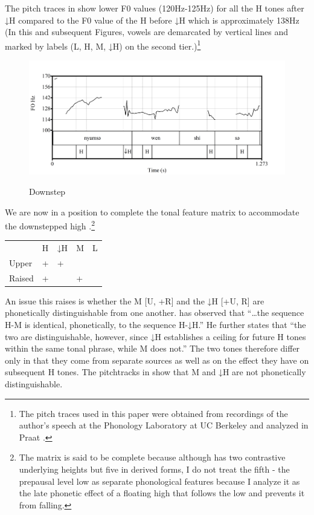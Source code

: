 \documentclass[output=paper,modfonts,nonflat,
colorlinks, citecolor=brown,
draftmode,
draft
]{langsci/langscibook}
\begin{document}
\ea\label{ex:akumbu:20}
\z

The pitch traces in  show lower F0 values (120Hz-125Hz) for all the H tones after ↓H compared to the F0 value of the H  before ↓H which is approximately 138Hz (In this and subsequent Figures, vowels are demarcated by vertical lines and marked by  labels (L, H, M, ↓H) on the second tier.)\footnote{The pitch traces used in this paper were obtained from recordings of the author’s speech at the Phonology Laboratory at UC Berkeley and analyzed in Praat \citep{Boersma2016}.}

\begin{figure}	
	{\includegraphics[width=\textwidth]{figures/fig-akumbu-1}}
	\caption{Downstep}\label{fig:akumbu:1}	
\end{figure}

We are now in a position to complete the tonal feature matrix to accommodate the downstepped high .\footnote{The matrix is said to be complete because although  has two contrastive underlying  heights but five in derived forms, I do not treat the fifth - the prepausal level low  as separate phonological  features because I analyze it as the late phonetic effect of a floating high  that follows the low  and prevents it from falling.} 

\ea\label{ex:akumbu:21}
\begin{tabular}[t]{lllll}
	&			H&	↓H&	M&	L\\
	Upper&		+&	+&	\textminus&	\textminus\\
	Raised&		+&	\textminus&	+&	\textminus\\
\end{tabular}
\z

An issue this raises is whether the M  [\textminus U, +R] and the ↓H  [+U, \textminus R] are phonetically distinguishable from one another. \citet[162]{Hyman1979babanki} has observed that “…the sequence H-M is identical, phonetically, to the sequence H-↓H.” He further states that “the two are distinguishable, however, since ↓H establishes a ceiling for future H tones within the same tonal phrase, while M does not.” The two tones therefore differ only in that they come from separate sources as well as on the effect they have on subsequent H tones. The pitchtracks in  show that M and ↓H are not phonetically distinguishable. 
\end{document}
